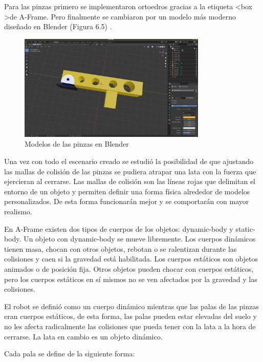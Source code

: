 Para las pinzas  primero se implementaron ortoedros gracias a la etiqueta  \textless box \textgreater de A-Frame. Pero finalmente se cambiaron por un modelo más moderno diseñado en Blender (Figura 6.5) .

\begin{figure}[H]
  \centering
 \includegraphics[width=0.8\textwidth, height=0.5\textwidth]{chapters/images/pinza.png}
  \caption{Modelos de las pinzas en Blender}
\end{figure}

Una vez con todo el escenario creado se estudió la posibilidad de que ajustando  las mallas de colisión de las pinzas se pudiera atrapar una lata con la fuerza que ejercieran al cerrarse. 
Las mallas de colisión son las líneas rojas que delimitan el entorno de un objeto y permiten definir una forma física alrededor de modelos personalizados. De esta forma funcionarán mejor y se comportarán con mayor realismo.

En A-Frame existen dos tipos de cuerpos de los objetos: dynamic-body y static-body. Un objeto con dynamic-body  se mueve libremente. Los cuerpos dinámicos tienen masa, chocan con otros objetos, rebotan o se ralentizan durante las colisiones y caen si la gravedad está habilitada.
Los cuerpos estáticos son objetos animados o de posición fija. Otros objetos pueden chocar con cuerpos estáticos, pero los cuerpos estáticos en sí mismos no se ven afectados por la gravedad y las colisiones.

El robot se definió como un cuerpo dinámico mientras que las palas de las pinzas eran cuerpos estáticos, de esta forma, las palas pueden estar elevadas del suelo y no les afecta  radicalmente las colisiones que pueda tener con la lata a la hora de cerrarse.  La lata en cambio es un objeto dinámico.

Cada pala se define de la siguiente forma: 

